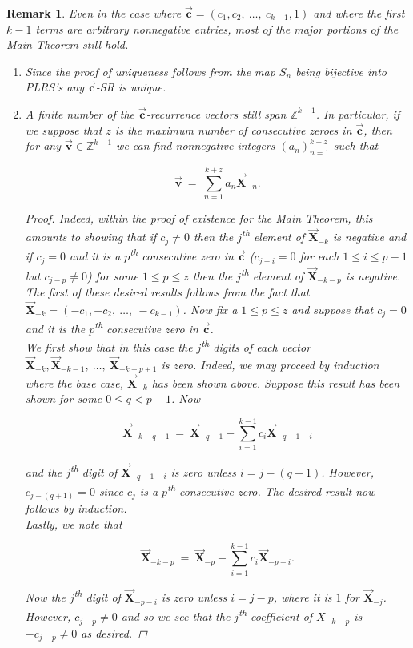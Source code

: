 \documentclass[]{interact}
\newcommand{\Z}{{\mathbb Z}}  %
\newcommand{\vtr}[1]{\vec{\mathbf{#1}}}
\theoremstyle{plain}
\numberwithin{equation}{section} %
\newtheorem{remark}[thm]{Remark}
\numberwithin{table}{section} %
\numberwithin{figure}{section}
\begin{document}
\begin{remark}\label{Rem: C-allspan}
Even in the case where $\vtr{c}=(c_1,c_2,\ \ldots, \ c_{k-1},1)$ and where the first $k-1$ terms are arbitrary nonnegative entries, most of the major portions of the Main Theorem still hold.

\begin{enumerate}
    \item Since the proof of uniqueness follows from the map $S_n$ being bijective into PLRS's any $\vtr{c}$-SR is unique.
    \item A finite number of the $\vtr{c}$-recurrence vectors still span $\Z^{k-1}$. In particular, if we suppose that $z$ is the maximum number of consecutive zeroes in $\vtr{c}$, then for any $\vtr{v}\in \Z^{k-1}$ we can find nonnegative integers $(a_n)_{n=1}^{k+z}$ such that

$$\vtr{v}\ =\ \sum_{n=1}^{k+z}a_n \vtr{X}_{-n}.$$

\begin{proof}
    Indeed, within the proof of existence for the Main Theorem, this amounts to showing that if $c_j\neq 0$ then the $j$\textsuperscript{th} element of $\vtr{X}_{-k}$ is negative and if $c_j=0$ and it is a $p$\textsuperscript{th} consecutive zero in $\vtr{c}$ ($c_{j-i}=0$ for each $1\leq i\leq p-1$ but $c_{j-p}\neq 0$) for some $1\leq p\leq z$ then the $j$\textsuperscript{th} element of $\vtr{X}_{-k-p}$ is negative. The first of these desired results follows from the fact that $\vtr{X}_{-k}=(-c_1,-c_2,\ \ldots,\ -c_{k-1})$. Now fix a $1\leq p\leq z$ and suppose that $c_j=0$ and it is the $p$\textsuperscript{th} consecutive zero in $\vtr{c}$.\\

We first show that in this case the $j$\textsuperscript{th} digits of each vector $\vtr{X}_{-k},\vtr{X}_{-k-1},\ \ldots,\ \vtr{X}_{-k-p+1}$ is zero. Indeed, we may proceed by induction where the base case, $\vtr{X}_{-k}$ has been shown above. Suppose this result has been shown for some $0\leq q<p-1$. Now

$$\vtr{X}_{-k-q-1}\ =\ \vtr{X}_{-q-1}-\sum_{i=1}^{k-1}c_i\vtr{X}_{-q-1-i}$$

\noindent and the $j$\textsuperscript{th} digit of $\vtr{X}_{-q-1-i}$ is zero unless $i=j-(q+1)$. However, $c_{j-(q+1)}=0$ since $c_j$ is a $p$\textsuperscript{th} consecutive zero. The desired result now follows by induction. \\

Lastly, we note that

$$\vtr{X}_{-k-p}\ =\ \vtr{X}_{-p}-\sum_{i=1}^{k-1}c_i\vtr{X}_{-p-i}. $$

Now the $j$\textsuperscript{th} digit of $\vtr{X}_{-p-i}$ is zero unless $i=j-p$, where it is $1$ for $\vtr{X}_{-j}$. However, $c_{j-p}\neq 0$ and so we see that the $j$\textsuperscript{th} coefficient of $X_{-k-p}$ is $-c_{j-p}\neq 0$ as desired.
\end{proof}
\end{enumerate}

\end{remark}
\end{document}
